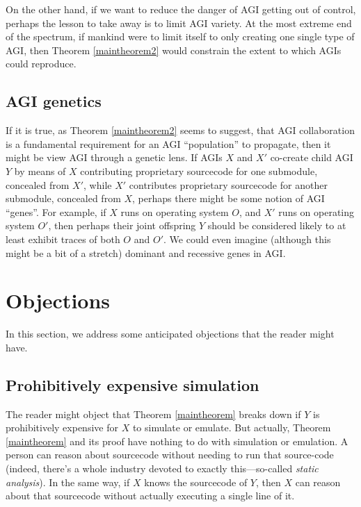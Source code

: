 \documentclass[runningheads]{llncs}
\begin{document}
On the other hand, if we want to reduce the danger of AGI getting out of control,
perhaps the lesson to take away is to limit AGI variety. At the most extreme end
of the spectrum, if mankind were to limit itself to only creating one single
type of AGI, then Theorem \ref{maintheorem2} would constrain the extent to which
AGIs could reproduce.


\subsection{AGI genetics}

If it is true, as Theorem \ref{maintheorem2} seems to suggest, that AGI collaboration
is a fundamental requirement for an AGI ``population'' to propagate, then it might
be view AGI through a genetic lens. If AGIs $X$ and $X'$ co-create child AGI $Y$ by
means of $X$ contributing proprietary sourcecode for one submodule, concealed from $X'$,
while $X'$ contributes proprietary sourcecode for another submodule, concealed from $X$,
perhaps there might be some notion of AGI ``genes''. For example, if $X$ runs on operating
system $O$, and $X'$ runs on operating system $O'$, then perhaps their joint offspring
$Y$ should be considered likely to at least exhibit traces of both $O$ and $O'$.
We could even imagine (although this might be a bit of a stretch) dominant and recessive
genes in AGI.


\section{Objections}
\label{objectionsection}

In this section, we address some anticipated objections that the reader might have.

\subsection{Prohibitively expensive simulation}

The reader might object that Theorem \ref{maintheorem} breaks down if $Y$ is prohibitively
expensive for $X$ to simulate or emulate. But actually, Theorem \ref{maintheorem} and its
proof have nothing to do with simulation or emulation. A person can reason about sourcecode
without needing to run that source-code (indeed, there's a whole industry devoted to
exactly this---so-called \emph{static analysis}). In the same way, if $X$ knows the sourcecode
of $Y$, then $X$ can reason about that sourcecode without actually executing a single line
of it.
\end{document}
